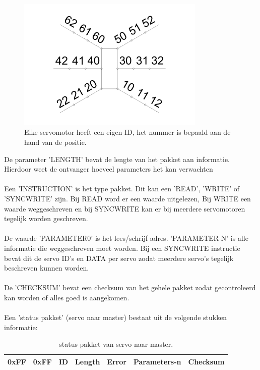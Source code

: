 \documentclass[10pt,a4paper]{article}
\begin{document}
\begin{figure}[h]
    \centering
    \includegraphics[width=0.8\textwidth]{hexapodid}
    \caption{Elke servomotor heeft een eigen ID, het nummer is bepaald aan de hand van de positie.}
    \label{fig:hexapodid}
\end{figure}



De parameter 'LENGTH' bevat de lengte van het pakket aan informatie. Hierdoor weet de ontvanger hoeveel parameters het kan verwachten\\\\
Een 'INSTRUCTION' is het type pakket. Dit kan een 'READ', 'WRITE' of 'SYNCWRITE' zijn. Bij READ word er een waarde uitgelezen, Bij WRITE een waarde weggeschreven en bij SYNCWRITE kan er bij meerdere servomotoren tegelijk worden geschreven.\\\\
De waarde 'PARAMETER0' is het lees/schrijf adres.
'PARAMETER-N' is alle informatie die weggeschreven moet worden. Bij een SYNCWRITE instructie bevat dit de servo ID's en DATA per servo zodat meerdere servo's tegelijk beschreven kunnen worden.\\\\
De 'CHECKSUM' bevat een checksum van het gehele pakket zodat gecontroleerd kan worden of alles goed is aangekomen.\\\\
Een 'status pakket' (servo naar master) bestaat uit de volgende stukken informatie:\\

\begin{table}[]
\centering
\caption{status pakket van servo naar master.}
\label{instructionpackage}
\begin{tabular}{|l|l|l|l|l|l|l|}
\hline
0xFF & 0xFF & ID & Length & Error & Parameters-n & Checksum \\ \hline
\end{tabular}
\end{table}
\end{document}
